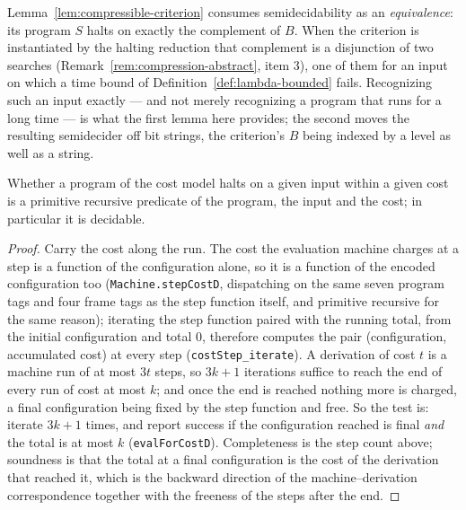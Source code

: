 Lemma~\ref{lem:compressible-criterion} consumes semidecidability as an \emph{equivalence}:
its program $S$ halts on exactly the complement of $B$. When the criterion is instantiated
by the halting reduction that complement is a disjunction of two searches
(Remark~\ref{rem:compression-abstract}, item 3), one of them for an input on which a time
bound of Definition~\ref{def:lambda-bounded} fails. Recognizing such an input exactly ---
and not merely recognizing a program that runs for a long time --- is what the first lemma
here provides; the second moves the resulting semidecider off bit strings, the criterion's
$B$ being indexed by a level as well as a string.

\begin{lemma}
\label{lem:cost-budget-decidable}
\leanok
Whether a program of the cost model halts on a given input within a given cost is a
primitive recursive predicate of the program, the input and the cost; in particular it is
decidable.
\end{lemma}

\begin{proof}
\leanok
Carry the cost along the run. The cost the evaluation machine charges at a step is a
function of the configuration alone, so it is a function of the encoded configuration too
(\texttt{Machine.stepCostD}, dispatching on the same seven program tags and four frame tags
as the step function itself, and primitive recursive for the same reason); iterating the
step function paired with the running total, from the initial configuration and total $0$,
therefore computes the pair (configuration, accumulated cost) at every step
(\texttt{costStep\_iterate}). A derivation of cost $t$ is a machine run of at most $3t$
steps, so $3k + 1$ iterations suffice to reach the end of every run of cost at most $k$;
and once the end is reached nothing more is charged, a final configuration being fixed by
the step function and free. So the test is: iterate $3k + 1$ times, and report success if
the configuration reached is final \emph{and} the total is at most $k$
(\texttt{evalForCostD}). Completeness is the step count above; soundness is that the total
at a final configuration is the cost of the derivation that reached it, which is the
backward direction of the machine--derivation correspondence together with the freeness of
the steps after the end.
\end{proof}

